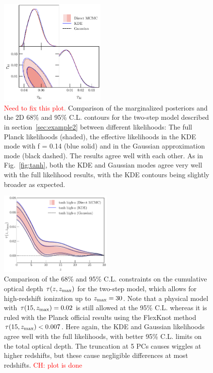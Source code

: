 \documentclass[prd,twocolumn,amsmath,amssymb,floatfix,superscriptaddress,nofootinbib]{revtex4-1}
\newcommand{\refsec}[1]{section~\ref{sec:#1}}
\newcommand{\zmax}{z_{\rm max}}
\newcommand{\ch}[1]{\textcolor{red}{#1}}
\begin{document}
%
%

\begin{figure}[t]
\includegraphics[width=0.47\textwidth]{paper/plots/pl18_tanh_highz_test5_run1_vs_relike_tanh_highz_test8_run9_f0p14_taulo_prior_0p03_zre_prior_6p1_taulo_prior_0p0_tri.pdf}
\caption{\ch{Need to fix this plot.}   Comparison of the marginalized posteriors and the 2D 68\% and 95\% C.L. contours for the two-step model  described in \refsec{example2} between different likelihoods: The full Planck likelihoods (shaded), the effective likelihoods in the KDE mode with f = 0.14 (blue solid) and in the Gaussian approximation mode (black dashed). The results agree well with each other. As in Fig.~\ref{fig:tanh}, both the KDE and Gaussian modes agree very well with the full likelihood results, with the KDE  contours being slightly broader as expected.
}
\label{fig:two_parameter_model_2D}
\end{figure}

\begin{figure}
\includegraphics[width=0.5\textwidth]{plots/pl18_taugtz_tanh_highz_direct_vs_kde_vs_gaussian_dz_auto_zre_prior_6p1.pdf}
\caption{Comparison of the 68\% and 95\% C.L. constraints on the cumulative optical depth $\tau(z, \zmax)$ for the two-step model, which allows for high-redshift ionization up to $\zmax =30$. Note that a physical model with $\tau(15, \zmax) = 0.02$ is still allowed at the 95\% C.L. whereas it is ruled with the Planck official results using the FlexKnot method $\tau(15, \zmax) < 0.007$. Here again, the KDE and Gaussian likelihoods agree well with the full likelihoods, with better 95\% C.L. limits on the total optical depth. The truncation at 5 PCs causes wiggles at higher redshifts, but these cause negligible differences at most redshifts.
\ch{CH: plot is done}}
\label{fig:plot_taugtz_two_step_contours}
\end{figure}
 
\end{document}
